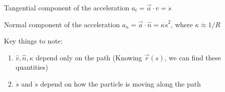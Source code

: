 \documentclass[10pt]{scrartcl}
\begin{document}
Tangential component of the acceleration $a_t = \vec{a}\cdot\hat{v} = \ddot{s}$

Normal component of the acceleration $a_n = \vec{a}\cdot\hat{n} = \kappa \dot{s}^2$, where $\kappa \approx 1/R$

\begin{center}
\end{center}


Key things to note:

\begin{enumerate}
    \item $\hat{v}, \hat{n}, \kappa$ depend only on the path (Knowing $\vec{r}(s)$, we can find these quantities)
    \item $\dot{s}$ and $\ddot{s}$ depend on how the particle is moving along the path
\end{enumerate}

\pagebreak
\end{document}

